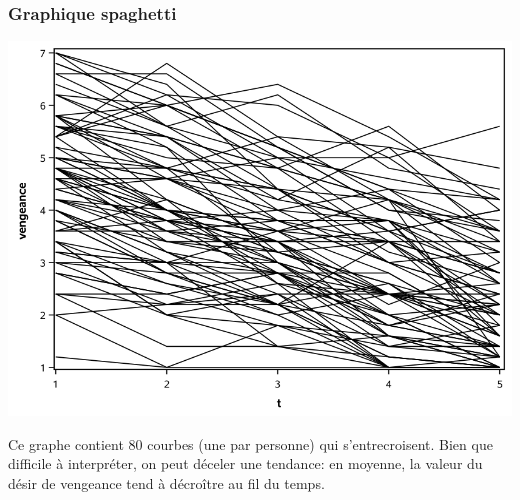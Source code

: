 \documentclass{beamer}
\begin{document}
\begin{frame}[fragile]
\frametitle{Graphique spaghetti}
\begin{center}
\includegraphics[width = 0.7\linewidth]{img/c5/diapos6-e02}
\end{center}
Ce graphe contient 80 courbes (une par personne) qui s'entrecroisent. Bien que difficile à interpréter, on peut déceler une
tendance: en moyenne, la valeur du désir de vengeance tend à décroître au fil du temps.
\end{frame}
\end{document}
